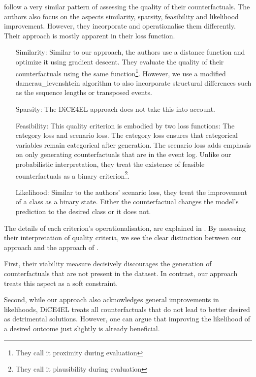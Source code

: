 \documentclass[./../../paper.tex]{subfiles}
\begin{document}
\citeauthor{hsieh_DiCE4ELInterpretingProcess_2021} follow a very similar pattern of assessing the quality of their counterfactuals. The authors also focus on the aspects similarity, sparsity, feasibility and likelihood improvement. However, they incorporate and operationalise them differently. Their approach is mostly apparent in their loss function.

\begin{itemize}
    \item[Similarity:] Similar to our approach, the authors use a distance function and optimize it using gradient descent. They evaluate the quality of their counterfactuals using the same function\footnote{They call it proximity during evaluation}. However, we use a modified \gls{damerau_levenshtein} algorithm to also incorporate structural differences such as the sequence lengths or transposed events.      
    \item[Sparsity:] The DiCE4EL approach does not take this into account.  
    \item[Feasibility:] This quality criterion is embodied by two loss functions: The category loss and scenario loss. The category loss ensures that categorical variables remain categorical after generation. The scenario loss adds emphasis on only generating counterfactuals that are in the event log. Unlike our probabilistic interpretation, they treat the existence of feasible counterfactuals as a binary criterion\footnote{They call it plausibility during evaluation}.   
    \item[Likelihood:] Similar to the authors' scenario loss, they treat the improvement of a class as a binary state. Either the counterfactual changes the model's prediction to the desired class or it does not.
\end{itemize}

The details of each criterion's operationalisation, are explained in \autocite{hsieh_DiCE4ELInterpretingProcess_2021}. By assessing their interpretation of quality criteria, we see the clear distinction between our approach and the approach of \citeauthor{hsieh_DiCE4ELInterpretingProcess_2021}. 

First, their viability measure decisively discourages the generation of counterfactuals that are not present in the dataset. In contrast, our approach treats this aspect as a soft constraint. 

Second, while our approach also acknowledges general improvements in likelihoods, DiCE4EL treats all counterfactuals that do not lead to better desired as detrimental solutions. However, one can argue that improving the likelihood of a desired outcome just slightly is already beneficial.
\end{document}
